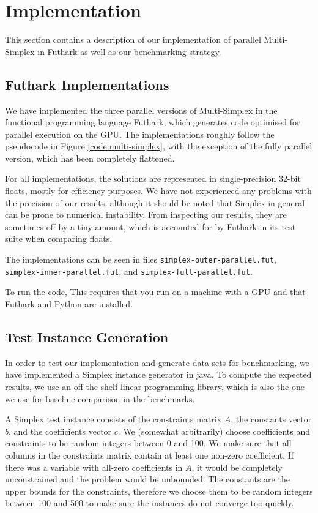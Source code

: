 \section{Implementation}

This section contains a description of our implementation of parallel Multi-Simplex in Futhark as well as our benchmarking strategy.

\subsection{Futhark Implementations}
We have implemented the three parallel versions of Multi-Simplex in the functional programming language Futhark, which generates code optimised for parallel execution on the GPU. The implementations roughly follow the pseudocode in Figure \ref{code:multi-simplex}, with the exception of the fully parallel version, which has been completely flattened.

For all implementations, the solutions are represented in single-precision 32-bit floats, mostly for efficiency purposes. We have not experienced any problems with the precision of our results, although it should be noted that Simplex in general can be prone to numerical instability. From inspecting our results, they are sometimes off by a tiny amount, which is accounted for by Futhark in its test suite when comparing floats.

The implementations can be seen in files \texttt{simplex-outer-parallel.fut}, \texttt{simplex-inner-parallel.fut}, and \texttt{simplex-full-parallel.fut}.

To run the code,  This requires that you run on a machine with a GPU and that Futhark and Python are installed.

\subsection{Test Instance Generation}
In order to test our implementation and generate data sets for benchmarking, we have implemented a Simplex instance generator in java. To compute the expected results, we use an off-the-shelf linear programming library, which is also the one we use for baseline comparison in the benchmarks.

\newpar A Simplex test instance consists of the constraints matrix $A$, the constants vector $b$, and the coefficients vector $c$.
We (somewhat arbitrarily) choose coefficients and constraints to be random integers between 0 and 100. We make sure that all columns in the constraints matrix contain at least one non-zero coefficient. If there was a variable with all-zero coefficients in $A$, it would be completely unconstrained and the problem would be unbounded. The constants are the upper bounds for the constraints, therefore we choose them to be random integers between 100 and 500 to make sure the instances do not converge too quickly.

